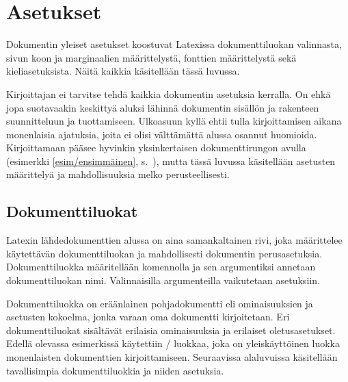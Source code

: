
\chapter{Asetukset}

Dokumentin yleiset asetukset koostuvat Latexissa dokumenttiluokan
valinnasta, sivun koon ja marginaalien määrittelystä, fonttien
määrittelystä sekä kieliasetuksista. Näitä kaikkia käsitellään tässä
luvussa.

Kirjoittajan ei tarvitse tehdä kaikkia dokumentin asetuksia kerralla. On
ehkä jopa suotavaakin keskittyä aluksi lähinnä dokumentin sisällön ja
rakenteen suunnitteluun ja tuottamiseen. Ulkoasuun kyllä ehtii tulla
kirjoittamisen aikana monenlaisia ajatuksia, joita ei olisi välttämättä
alussa osannut huomioida. Kirjoittamaan pääsee hyvinkin yksinkertaisen
dokumenttirungon avulla (esimerkki \ref{esim/ensimmäinen},
s.~\pageref{esim/ensimmäinen}), mutta tässä luvussa käsitellään
asetusten määrittelyä ja mahdollisuuksia melko perusteellisesti.

\section{Dokumenttiluokat}
\label{luku/dokumenttiluokat}

Latexin lähdedokumenttien alussa on aina samankaltainen rivi, joka
määrittelee käytettävän dokumenttiluokan ja mahdollisesti dokumentin
perusasetuksia. Dokumenttiluokka määritellään komennolla
 ja sen argumentiksi annetaan dokumenttiluokan
nimi. Valinnaisilla argumenteilla vaikutetaan asetuksiin.


\noindent
Dokumenttiluokka on eräänlainen pohjadokumentti eli ominaisuuksien ja
asetusten kokoelma, jonka varaan oma dokumentti kirjoitetaan. Eri
dokumenttiluokat sisältävät erilaisia ominaisuuksia ja erilaiset
oletusasetukset. Edellä olevassa esimerkissä käytettiin
\-/ luokkaa, joka on yleiskäyttöinen luokka monenlaisten
dokumenttien kirjoittamiseen. Seuraavissa alaluvuissa käsitellään
tavallisimpia dokumenttiluokkia ja niiden asetuksia.


